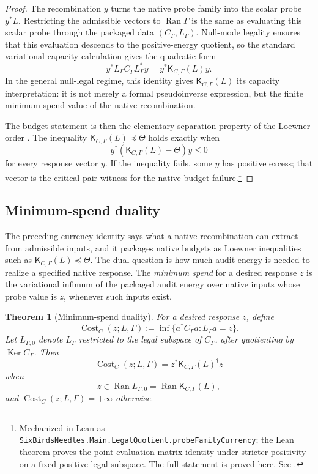 \documentclass[11pt]{article}
\DeclareMathOperator{\Cost}{Cost}
\DeclareMathOperator{\Ran}{Ran}
\DeclareMathOperator{\Ker}{Ker}
\newcommand{\K}{\mathsf K}
\newcommand{\preceqq}{\preceq}
\newtheorem{theorem}{Theorem}[section]
\theoremstyle{definition}
\begin{document}
\begin{proof}
The recombination \(y\) turns the native probe family into the scalar
probe \(y^*L\).  Restricting the admissible vectors to \(\Ran\Gamma\)
is the same as evaluating this scalar probe through the packaged data
\((C_\Gamma,L_\Gamma)\).  Null-mode legality ensures that this
evaluation descends to the positive-energy quotient, so the standard
variational capacity calculation gives the quadratic form
\[
  y^*L_\Gamma C_\Gamma^\dagger L_\Gamma^*y
  =y^*\K_{C,\Gamma}(L)y.
\]
In the general null-legal regime, this identity gives \(\K_{C,\Gamma}(L)\)
its capacity interpretation: it is not merely a formal pseudoinverse
expression, but the finite minimum-spend value of the native
recombination.

The budget statement is then the elementary separation property of the
Loewner order \citep{Lowner1934Monotone,Bhatia1997MatrixAnalysis}.  The inequality
\(\K_{C,\Gamma}(L)\preceqq\Theta\) holds exactly when
\[
  y^*(\K_{C,\Gamma}(L)-\Theta)y\le 0
\]
for every response vector \(y\).  If the inequality fails, some \(y\)
has positive excess; that vector is the critical-pair witness for the
native budget failure.\footnote{Mechanized in Lean as
\texttt{SixBirdsNeedles.Main.LegalQuotient.probeFamilyCurrency}; the Lean
theorem proves the point-evaluation matrix identity under stricter
positivity on a fixed positive legal subspace.  The full statement is
proved here.  See .}
\end{proof}

\subsection{Minimum-spend duality}

The preceding currency identity says what a native recombination can
extract from admissible inputs, and it packages native budgets as
Loewner inequalities such as \(\K_{C,\Gamma}(L)\preceqq\Theta\).
The dual question is how much audit energy is needed to realize a
specified native response.  The \emph{minimum spend} for a desired
response \(z\) is the variational infimum of the packaged audit energy
over native inputs whose probe value is \(z\), whenever such inputs
exist.

\begin{theorem}[Minimum-spend duality]\label{thm:main:minimum-spend-duality}
For a desired response \(z\), define
\[
  \Cost_C(z;L,\Gamma)
    :=\inf\{a^*C_\Gamma a: L_\Gamma a=z\}.
\]
Let \(L_{\Gamma,0}\) denote \(L_\Gamma\) restricted to the legal
subspace of \(C_\Gamma\), after quotienting by \(\Ker C_\Gamma\).
Then
\[
  \Cost_C(z;L,\Gamma)
    =z^*\K_{C,\Gamma}(L)^\dagger z
\]
when
\[
  z\in\Ran L_{\Gamma,0}=\Ran\K_{C,\Gamma}(L),
\]
and \(\Cost_C(z;L,\Gamma)=+\infty\) otherwise.
\end{theorem}
\end{document}
